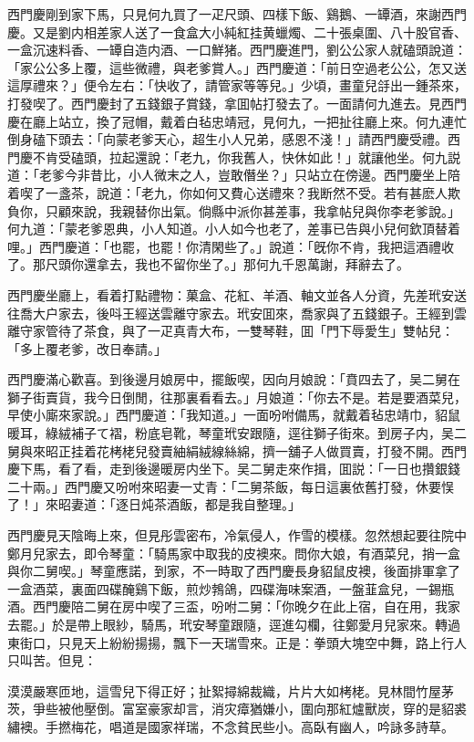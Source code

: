 西門慶剛到家下馬，只見何九買了一疋尺頭、四樣下飯、鷄鵝、一罈酒，來謝西門慶。又是劉内相差家人送了一食盒大小純紅挂黄蠟燭、二十張桌圍、八十股官香、一盒沉速料香、一罈自造内酒、一口鮮猪。西門慶進門，劉公公家人就磕頭說道：「家公公多上覆，這些微禮，與老爹賞人。」西門慶道：「前日空過老公公，怎又送這厚禮來？」便令左右：「快收了，請管家等等兒。」少頃，畫童兒㧱出一鍾茶來，打發喫了。西門慶封了五錢銀子賞錢，拿囬帖打發去了。一面請何九進去。見西門慶在廳上站立，換了冠帽，戴着白毡忠靖冠，見何九，一把扯往廳上來。何九連忙倒身磕下頭去：「向蒙老爹天心，超生小人兄弟，感恩不淺！」請西門慶受禮。西門慶不肯受磕頭，拉起還說：「老九，你我舊人，快休如此！」就讓他坐。何九説道：「老爹今非昔比，小人微末之人，豈敢僭坐？」只站立在傍邊。西門慶坐上陪着喫了一盞茶，說道：「老九，你如何又費心送禮來？我断然不受。若有甚麽人欺負你，只顧來說，我親替你出氣。倘縣中派你甚差事，我拿帖兒與你李老爹說。」何九道：「蒙老爹恩典，小人知道。小人如今也老了，差事已告與小兒何欽頂替着哩。」西門慶道：「也罷，也罷！你清閑些了。」說道：「旣你不肯，我把這酒禮收了。那尺頭你還拿去，我也不留你坐了。」那何九千恩萬謝，拜辭去了。

西門慶坐廳上，看着打點禮物：菓盒、花紅、羊酒、軸文並各人分資，先差玳安送往喬大户家去，後呌王經送雲離守家去。玳安囬來，喬家與了五錢銀子。王經到雲離守家管待了茶食，與了一疋真青大布，一雙琴鞋，囬「門下辱愛生」雙帖兒：「多上覆老爹，改日奉請。」

西門慶滿心歡喜。到後邊月娘房中，擺飯喫，因向月娘說：「賁四去了，吴二舅在獅子街賣貨，我今日倒閒，往那裏看看去。」月娘道：「你去不是。若是要酒菜兒，早使小廝來家說。」西門慶道：「我知道。」一面吩咐備馬，就戴着毡忠靖巾，貂鼠暖耳，綠絨補子て褶，粉底皂靴，琴童玳安跟隨，逕往獅子街來。到房子内，吴二舅與來昭正挂着花栲栳兒發賣紬絹絨線絲綿，擠一舖子人做買賣，打發不開。西門慶下馬，看了看，走到後邊暖房内坐下。吴二舅走來作揖，囬説：「一日也攢銀錢二十兩。」西門慶又吩咐來昭妻一丈青：「二舅茶飯，每日這裏依舊打發，休要悮了！」來昭妻道：「逐日炖茶酒飯，都是我自整理。」

西門慶見天陰晦上來，但見彤雲密布，冷氣侵人，作雪的模樣。忽然想起要往院中鄭月兒家去，即令琴童：「騎馬家中取我的皮襖來。問你大娘，有酒菜兒，捎一盒與你二舅喫。」琴童應諾，到家，不一時取了西門慶長身貂鼠皮襖，後面排軍拿了一盒酒菜，裏面四碟醃鷄下飯，煎炒鵓鴿，四碟海味案酒，一盤韮盒兒，一錫瓶酒。西門慶陪二舅在房中喫了三盃，吩咐二舅：「你晚夕在此上宿，自在用，我家去罷。」於是帶上眼紗，騎馬，玳安琴童跟隨，逕進勾欄，往鄭愛月兒家來。轉過東街口，只見天上紛紛揚揚，飄下一天瑞雪來。正是：拳頭大塊空中舞，路上行人只叫苦。但見：

漠漠嚴寒匝地，這雪兒下得正好；扯絮撏綿裁織，片片大如栲栳。見林間竹屋茅茨，爭些被他壓倒。富室豪家却言，消灾瘴猶嫌小，圍向那紅爐獸炭，穿的是貂裘繡襖。手撚梅花，唱道是國家祥瑞，不念貧民些小。高臥有幽人，吟詠多詩草。

